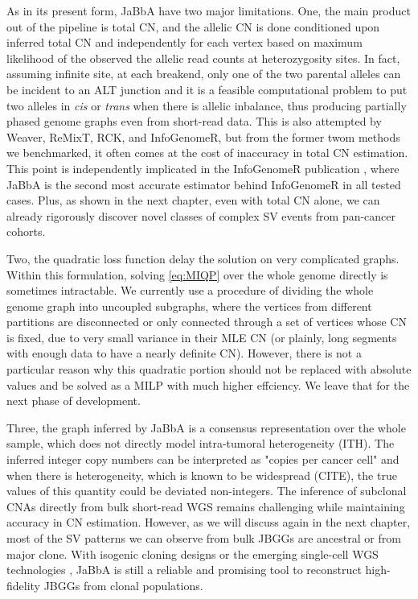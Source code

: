 \documentclass[phd,tocprelim]{cornell}
\begin{document}
As in its present form, JaBbA have two major limitations. One, the main product out of the pipeline is total CN, and the allelic CN is done conditioned upon inferred total CN and independently for each vertex based on maximum likelihood of the observed the allelic read counts at heterozygosity sites. In fact, assuming infinite site, at each breakend, only one of the two parental alleles can be incident to an ALT junction and it is a feasible computational problem to put two alleles in \textit{cis} or \textit{trans} when there is allelic inbalance, thus producing partially phased genome graphs even from short-read data. This is also attempted by Weaver, ReMixT, RCK, and InfoGenomeR, but from the former twom methods we benchmarked, it often comes at the cost of inaccuracy in total CN estimation. This point is independently implicated in the InfoGenomeR publication \cite{Lee2021-rl}, where JaBbA is the second most accurate estimator behind InfoGenomeR in all tested cases. Plus, as shown in the next chapter, even with total CN alone, we can already rigorously discover novel classes of complex SV events from pan-cancer cohorts.

Two, the quadratic loss function delay the solution on very complicated graphs. Within this formulation, solving \ref{eq:MIQP} over the whole genome directly is sometimes intractable. We currently use a procedure of dividing the whole genome graph into uncoupled subgraphs, where the vertices from different partitions are disconnected or only connected through a set of vertices whose CN is fixed, due to very small variance in their MLE CN (or plainly, long segments with enough data to have a nearly definite CN). However, there is not a particular reason why this quadratic portion should not be replaced with absolute values and be solved as a MILP with much higher effciency. We leave that for the next phase of development.

Three, the graph inferred by JaBbA is a consensus representation over the whole sample, which does not directly model intra-tumoral heterogeneity (ITH). The inferred integer copy numbers can be interpreted as "copies per cancer cell" and when there is heterogeneity, which is known to be widespread (CITE), the true values of this quantity could be deviated non-integers. The inference of subclonal CNAs directly from bulk short-read WGS remains challenging \cite{McPherson2017-ry} while maintaining accuracy in CN estimation. However, as we will discuss again in the next chapter, most of the SV patterns we can observe from bulk JBGGs are ancestral or from major clone. With isogenic cloning designs \cite{Dewhurst2021-jk} or the emerging single-cell WGS technologies \cite{Zahn2017-re,laks2019,Salehi2021-xi}, JaBbA is still a reliable and promising tool to reconstruct high-fidelity JBGGs from clonal populations.
\end{document}
